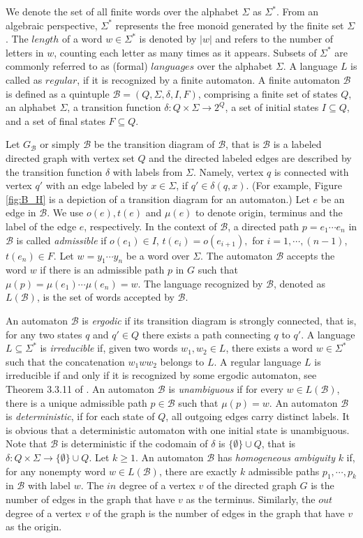 \documentclass{article}
\newcommand{\B}{\mathcal{B}}
\begin{document}
We denote the set of all finite words over the alphabet $\Sigma$ as $\Sigma^*$. From an algebraic perspective, $\Sigma^*$ represents the free monoid generated by the finite set $\Sigma$. The $length$ of a word $w \in \Sigma^*$ is denoted by $|w|$ and refers to the number of letters in $w$, counting each letter as many times as it appears. Subsets of $\Sigma^*$ are commonly referred to as (formal) $languages$ over the alphabet $\Sigma$. A language $L$ is called as $regular$, if it is recognized by a finite automaton. A finite automaton $\B$ is defined as a quintuple $\B = (Q,\Sigma,\delta,I,F)$, comprising a finite set of states $Q$, an alphabet $\Sigma$, a transition function $\delta:Q\times\Sigma \rightarrow 2^Q$, a set of initial states $I \subseteq Q$, and a set of final states $F \subseteq Q$.

Let $G_{\B}$ or simply $\B$ be the transition diagram of $\B$, that is $\B$ is a labeled directed graph with vertex set $Q$ and the directed labeled edges are described by the transition function $\delta$ with labels from $\Sigma$. Namely, vertex $q$ is connected with vertex $q'$ with an edge labeled by $x \in \Sigma$, if $q' \in \delta(q, x)$. (For example, Figure \ref{fig:B_H} is a depiction of a transition diagram for an automaton.) Let $e$ be an edge in $\B$. We use $o(e), t(e)$ and $\mu(e)$ to denote origin, terminus and the label of the edge $e$, respectively. In the context of $\B$, a directed path $p=e_1\cdots e_n$ in $\B$ is called \emph{admissible} if $o(e_1) \in I$, $t(e_i) = o(e_{i+1}),$ for $i = 1,\cdots,(n-1)$, $t(e_n) \in F$. Let $w = y_1\cdots y_n$ be a word over $\Sigma$. The automaton $\B$ accepts the word $w$ if there is an admissible path $p$ in $G$ such that $\mu(p) = \mu(e_1)\cdots \mu(e_n) = w$. The language recognized by $\B$, denoted as $L(\B)$, is the set of words accepted by $\B$.

An automaton $\B$ is \emph{ergodic} if its transition diagram is strongly connected, that is, for any two states $q$ and $q' \in Q$ there exists a path connecting $q$ to $q'$. A language $L \subseteq \Sigma^*$ is \emph{irreducible} if, given two words $w_1, w_2 \in L$, there exists a word $w \in \Sigma^*$ such that the concatenation $w_1ww_2$ belongs to $L$. A regular language $L$ is irreducible if and only if it is recognized by some ergodic automaton, see Theorem 3.3.11 of \cite{Lind-Marcus}. An automaton $\B$ is \emph{unambiguous} if for every $w \in L(\B)$, there is a unique admissible path $p \in \B$ such that $\mu(p) = w$. An automaton $\B$ is \emph{deterministic}, if for each state of $Q$, all outgoing edges carry distinct labels. It is obvious that a deterministic automaton with one initial state is unambiguous. Note that $\B$ is deterministic if the codomain of $\delta$ is $\{\emptyset\} \cup Q$, that is $\delta:Q\times\Sigma \rightarrow \{\emptyset\} \cup Q$. Let $k \geq 1$. An automaton $\B$ has \emph{homogeneous ambiguity} $k$ if, for any nonempty word $w \in L(\B)$, there are exactly $k$ admissible paths $p_1,\cdots,p_k$ in $\B$ with label $w$. The $in$ degree of a vertex $v$ of the directed graph $G$ is the number of edges in the graph that have $v$ as the terminus. Similarly, the $out$ degree of a vertex $v$ of the graph is the number of edges in the graph that have $v$ as the origin. 
\end{document}
